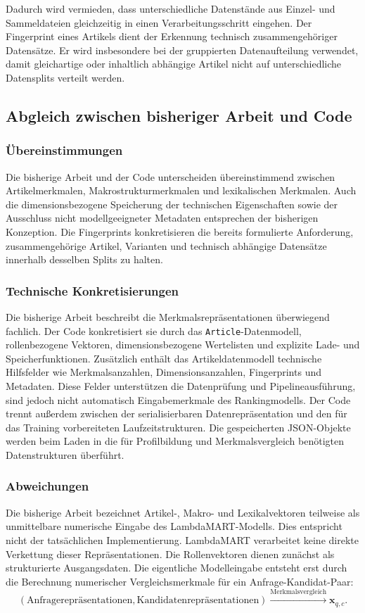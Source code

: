 Dadurch wird vermieden, dass unterschiedliche Datenstände aus Einzel- und Sammeldateien gleichzeitig in einen Verarbeitungsschritt eingehen. Der Fingerprint eines Artikels dient der Erkennung technisch zusammengehöriger Datensätze. Er wird insbesondere bei der gruppierten Datenaufteilung verwendet, damit gleichartige oder inhaltlich abhängige Artikel nicht auf unterschiedliche Datensplits verteilt werden. 
\subsection{Abgleich zwischen bisheriger Arbeit und Code} 
\label{subsec:abgleich_datenrepraesentationen} 
\subsubsection*{Übereinstimmungen} Die bisherige Arbeit und der Code unterscheiden übereinstimmend zwischen Artikelmerkmalen, Makrostrukturmerkmalen und lexikalischen Merkmalen. Auch die dimensionsbezogene Speicherung der technischen Eigenschaften sowie der Ausschluss nicht modellgeeigneter Metadaten entsprechen der bisherigen Konzeption. Die Fingerprints konkretisieren die bereits formulierte Anforderung, zusammengehörige Artikel, Varianten und technisch abhängige Datensätze innerhalb desselben Splits zu halten. \subsubsection*{Technische Konkretisierungen} Die bisherige Arbeit beschreibt die Merkmalsrepräsentationen überwiegend fachlich. Der Code konkretisiert sie durch das \texttt{Article}-Datenmodell, rollenbezogene Vektoren, dimensionsbezogene Wertelisten und explizite Lade- und Speicherfunktionen. Zusätzlich enthält das Artikeldatenmodell technische Hilfsfelder wie Merkmalsanzahlen, Dimensionsanzahlen, Fingerprints und Metadaten. Diese Felder unterstützen die Datenprüfung und Pipelineausführung, sind jedoch nicht automatisch Eingabemerkmale des Rankingmodells. Der Code trennt außerdem zwischen der serialisierbaren Datenrepräsentation und den für das Training vorbereiteten Laufzeitstrukturen. Die gespeicherten JSON-Objekte werden beim Laden in die für Profilbildung und Merkmalsvergleich benötigten Datenstrukturen überführt. \subsubsection*{Abweichungen} Die bisherige Arbeit bezeichnet Artikel-, Makro- und Lexikalvektoren teilweise als unmittelbare numerische Eingabe des LambdaMART-Modells. Dies entspricht nicht der tatsächlichen Implementierung. LambdaMART verarbeitet keine direkte Verkettung dieser Repräsentationen. Die Rollenvektoren dienen zunächst als strukturierte Ausgangsdaten. Die eigentliche Modelleingabe entsteht erst durch die Berechnung numerischer Vergleichsmerkmale für ein Anfrage-Kandidat-Paar: \begin{equation} \left( \text{Anfragerepräsentationen}, \text{Kandidatenrepräsentationen} \right) \xrightarrow{\text{Merkmalsvergleich}} \boldsymbol{x}_{q,c}. \label{eq:bildung_paarmerkmalsvektor} \end{equation} 